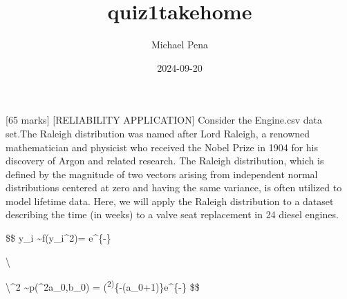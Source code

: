 \documentclass[
]{article}
\title{quiz1takehome}
\author{Michael Pena}
\date{2024-09-20}
\begin{document}
\maketitle

{[}65 marks{]} {[}RELIABILITY APPLICATION{]} Consider the Engine.csv
data set.The Raleigh distribution was named after Lord Raleigh, a
renowned mathematician and physicist who received the Nobel Prize in
1904 for his discovery of Argon and related research. The Raleigh
distribution, which is defined by the magnitude of two vectors arising
from independent normal distributions centered at zero and having the
same variance, is often utilized to model lifetime data. Here, we will
apply the Raleigh distribution to a dataset describing the time (in
weeks) to a valve seat replacement in 24 diesel engines.

\$\$ y\_i \sim f(y\_i\textbar{}\sigma\^{}2)=
e\^{}\{-\}

\textbackslash{}

\textbackslash{}\sigma\^{}2 \sim p(\sigma\^{}2\textbar a\_0,b\_0) =
(\sigma\textsuperscript{2)}\{-(a\_0+1)\}e\^{}\{-\}
\$\$
\end{document}
